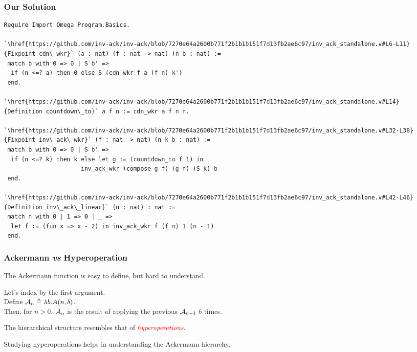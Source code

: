 \begin{frame}[fragile]
\frametitle{Our Solution}

\vspace{-1em}
\lstset{style=myTinyStyle}
\begin{mdframed}[backgroundcolor=lightgray, roundcorner=10pt,leftmargin=0, rightmargin=0, innerleftmargin=0, innertopmargin=-5,innerbottommargin=-5, outerlinewidth=0, linecolor=lightgray]
\begin{lstlisting}
Require Import Omega Program.Basics.

`\href{https://github.com/inv-ack/inv-ack/blob/7270e64a2600b771f2b1b1b151f7d13fb2ae6c97/inv_ack_standalone.v#L6-L11}{Fixpoint cdn\_wkr}` (a : nat) (f : nat -> nat) (n b : nat) :=
 match b with 0 => 0 | S b' =>
  if (n <=? a) then 0 else S (cdn_wkr f a (f n) k')
 end.

`\href{https://github.com/inv-ack/inv-ack/blob/7270e64a2600b771f2b1b1b151f7d13fb2ae6c97/inv_ack_standalone.v#L14}{Definition countdown\_to}` a f n := cdn_wkr a f n n.

`\href{https://github.com/inv-ack/inv-ack/blob/7270e64a2600b771f2b1b1b151f7d13fb2ae6c97/inv_ack_standalone.v#L32-L38} {Fixpoint inv\_ack\_wkr}` (f : nat -> nat) (n k b : nat) :=
 match b with 0 => 0 | S b' =>
  if (n <=? k) then k else let g := (countdown_to f 1) in
                      inv_ack_wkr (compose g f) (g n) (S k) b
 end.

`\href{https://github.com/inv-ack/inv-ack/blob/7270e64a2600b771f2b1b1b151f7d13fb2ae6c97/inv_ack_standalone.v#L42-L46}{Definition inv\_ack\_linear}` (n : nat) : nat :=
 match n with 0 | 1 => 0 | _ => 
  let f := (fun x => x - 2) in inv_ack_wkr f (f n) 1 (n - 1)
 end.
\end{lstlisting}
\end{mdframed} 
\end{frame}


\begin{frame}
\frametitle{Ackermann \emph{vs} Hyperoperation}

The Ackermann function is easy to define, but hard to
understand.

\bigskip

\pause 	
Let's index by the first argument. \\ \smallskip
Define $\mathcal{A}_n \triangleq \lambda b.A(n,b)$. \\ \smallskip
Then, for $n>0$, $\mathcal{A}_n$ is the result of applying the previous $\mathcal{A}_{n-1}$ $b$ times.


\bigskip

\pause 
The hierarchical structure resembles that of \textcolor{red}{\emph{hyperoperations}}.

\smallskip
Studying hyperoperations helps in understanding the Ackermann hierarchy.

\end{frame}


